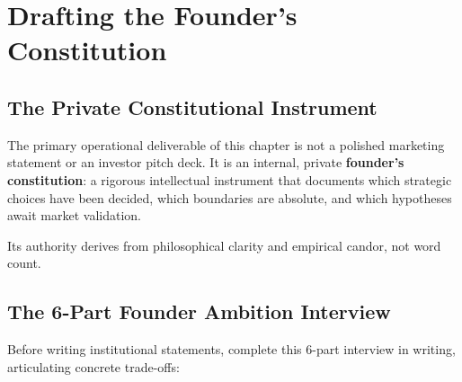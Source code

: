 \section{Drafting the Founder's Constitution}

\subsection{The Private Constitutional Instrument}

The primary operational deliverable of this chapter is not a polished marketing statement or an investor pitch deck. It is an internal, private \textbf{founder's constitution}: a rigorous intellectual instrument that documents which strategic choices have been decided, which boundaries are absolute, and which hypotheses await market validation.

Its authority derives from philosophical clarity and empirical candor, not word count.

\subsection{The 6-Part Founder Ambition Interview}

Before writing institutional statements, complete this 6-part interview in writing, articulating concrete trade-offs:

